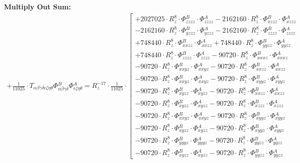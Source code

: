 \documentclass{article}
\begin{document}
\textbf{Multiply Out Sum:}
\begin{subequations}\begin{gather}
+ \frac{1}{11025} \cdot T_{\alpha{}\beta{}\gamma{}\delta{}\epsilon{}\zeta{}\eta{}\theta{}} \Phi{}^{B}_{\alpha{}\beta{}\gamma{}\delta{}} \Phi{}^{A}_{\epsilon{}\zeta{}\eta{}\theta{}} = R_{z}^{-17} \cdot \frac{1}{11025} \cdot  \left[ \begin{array}{c} 
 		+ 2027025 \cdot R_{z}^{8} \cdot \Phi{}^{B}_{zzzz} \cdot \Phi{}^{A}_{zzzz}- 2162160 \cdot R_{z}^{8} \cdot \Phi{}^{B}_{xzzz} \cdot \Phi{}^{A}_{xzzz} 
 \\[0.2em] 		 - 2162160 \cdot R_{z}^{8} \cdot \Phi{}^{B}_{yzzz} \cdot \Phi{}^{A}_{yzzz}- 2162160 \cdot R_{z}^{8} \cdot \Phi{}^{B}_{zzzz} \cdot \Phi{}^{A}_{zzzz} 
 \\[0.2em] 		 + 748440 \cdot R_{z}^{8} \cdot \Phi{}^{B}_{xxzz} \cdot \Phi{}^{A}_{xxzz}+ 748440 \cdot R_{z}^{8} \cdot \Phi{}^{B}_{yyzz} \cdot \Phi{}^{A}_{yyzz} 
 \\[0.2em] 		 + 748440 \cdot R_{z}^{8} \cdot \Phi{}^{B}_{zzzz} \cdot \Phi{}^{A}_{zzzz}- 90720 \cdot R_{z}^{8} \cdot \Phi{}^{B}_{xxxz} \cdot \Phi{}^{A}_{xxxz} 
 \\[0.2em] 		 - 90720 \cdot R_{z}^{8} \cdot \Phi{}^{B}_{xxyz} \cdot \Phi{}^{A}_{xxyz}- 90720 \cdot R_{z}^{8} \cdot \Phi{}^{B}_{xxzz} \cdot \Phi{}^{A}_{xxzz} 
 \\[0.2em] 		 - 90720 \cdot R_{z}^{8} \cdot \Phi{}^{B}_{xxyz} \cdot \Phi{}^{A}_{xxyz}- 90720 \cdot R_{z}^{8} \cdot \Phi{}^{B}_{xyyz} \cdot \Phi{}^{A}_{xyyz} 
 \\[0.2em] 		 - 90720 \cdot R_{z}^{8} \cdot \Phi{}^{B}_{xyzz} \cdot \Phi{}^{A}_{xyzz}- 90720 \cdot R_{z}^{8} \cdot \Phi{}^{B}_{xxzz} \cdot \Phi{}^{A}_{xxzz} 
 \\[0.2em] 		 - 90720 \cdot R_{z}^{8} \cdot \Phi{}^{B}_{xyzz} \cdot \Phi{}^{A}_{xyzz}- 90720 \cdot R_{z}^{8} \cdot \Phi{}^{B}_{xzzz} \cdot \Phi{}^{A}_{xzzz} 
 \\[0.2em] 		 - 90720 \cdot R_{z}^{8} \cdot \Phi{}^{B}_{xxyz} \cdot \Phi{}^{A}_{xxyz}- 90720 \cdot R_{z}^{8} \cdot \Phi{}^{B}_{xyyz} \cdot \Phi{}^{A}_{xyyz} 
 \\[0.2em] 		 - 90720 \cdot R_{z}^{8} \cdot \Phi{}^{B}_{xyzz} \cdot \Phi{}^{A}_{xyzz}- 90720 \cdot R_{z}^{8} \cdot \Phi{}^{B}_{xyyz} \cdot \Phi{}^{A}_{xyyz} 
 \\[0.2em] 		 - 90720 \cdot R_{z}^{8} \cdot \Phi{}^{B}_{yyyz} \cdot \Phi{}^{A}_{yyyz}- 90720 \cdot R_{z}^{8} \cdot \Phi{}^{B}_{yyzz} \cdot \Phi{}^{A}_{yyzz} 
 \\[0.2em] 		 - 90720 \cdot R_{z}^{8} \cdot \Phi{}^{B}_{xyzz} \cdot \Phi{}^{A}_{xyzz}- 90720 \cdot R_{z}^{8} \cdot \Phi{}^{B}_{yyzz} \cdot \Phi{}^{A}_{yyzz} 

\end{array}
\end{gather}
\end{subequations}
\end{document}
